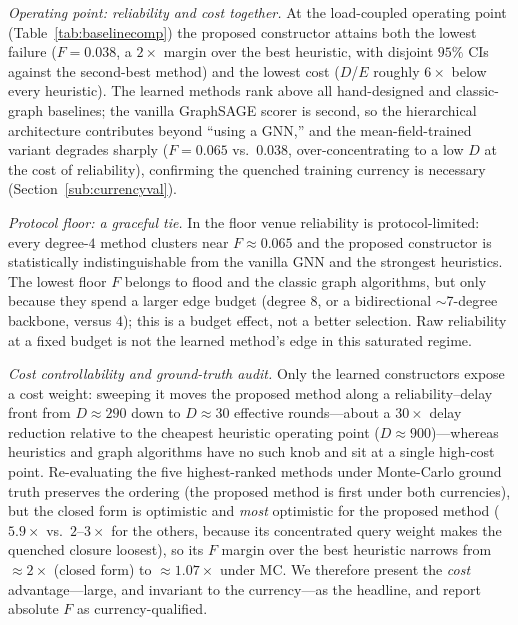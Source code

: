 \documentclass[journal]{IEEEtran}
\begin{document}
\emph{Operating point: reliability and cost together.} At the load-coupled
operating point (Table~\ref{tab:baselinecomp}) the proposed constructor attains
both the lowest failure ($F{=}0.038$, a $2\times$ margin over the best heuristic,
with disjoint $95\%$ CIs against the second-best method) and the lowest cost
($D$/$E$ roughly $6\times$ below every heuristic). The learned methods rank above
all hand-designed and classic-graph baselines; the vanilla GraphSAGE scorer is
second, so the hierarchical architecture contributes beyond ``using a GNN,'' and
the mean-field-trained variant degrades sharply ($F{=}0.065$ vs.\ $0.038$,
over-concentrating to a low $D$ at the cost of reliability), confirming the
quenched training currency is necessary (Section~\ref{sub:currencyval}).

\emph{Protocol floor: a graceful tie.} In the floor venue reliability is
protocol-limited: every degree-$4$ method clusters near $F{\approx}0.065$ and the
proposed constructor is statistically indistinguishable from the vanilla GNN and
the strongest heuristics. The lowest floor $F$ belongs to flood and the classic
graph algorithms, but only because they spend a larger edge budget (degree $8$, or
a bidirectional $\sim$7-degree backbone, versus $4$); this is a budget effect, not
a better selection. Raw reliability at a fixed budget is not the learned method's
edge in this saturated regime.

\emph{Cost controllability and ground-truth audit.} Only the learned constructors
expose a cost weight: sweeping it moves the proposed method along a
reliability--delay front from $D{\approx}290$ down to $D{\approx}30$ effective
rounds---about a $30\times$ delay reduction relative to the cheapest heuristic
operating point ($D{\approx}900$)---whereas heuristics and graph algorithms have no
such knob and sit at a single high-cost point. Re-evaluating the five
highest-ranked methods under Monte-Carlo ground truth preserves the ordering (the
proposed method is first under both currencies), but the closed form is optimistic
and \emph{most} optimistic for the proposed method ($5.9\times$ vs.\ $2$--$3\times$
for the others, because its concentrated query weight makes the quenched closure
loosest), so its $F$ margin over the best heuristic narrows from $\approx2\times$
(closed form) to $\approx1.07\times$ under MC. We therefore present the
\emph{cost} advantage---large, and invariant to the currency---as the headline,
and report absolute $F$ as currency-qualified.
\end{document}
